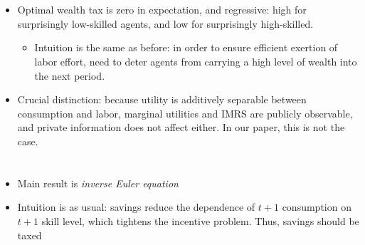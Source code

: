 \documentclass[11pt]{article}
\begin{document}
\section{\cite{kocherlakota2005zero}}
\begin{itemize}
    \item Optimal wealth tax is zero in expectation, and regressive: high for surprisingly low-skilled agents, and low for surprisingly high-skilled. 
    \begin{itemize}
        \item Intuition is the same as before: in order to ensure efficient exertion of labor effort, need to deter agents from carrying a high level of wealth into the next period. 
    \end{itemize}
    \item Crucial distinction: because utility is additively separable between consumption and labor, marginal utilities and IMRS are publicly observable, and private information does not affect either. In our paper, this is not the case. 
\end{itemize}

\section{\cite{golosov2003optimal}} \label{sec:golosov03}
\begin{itemize}
    \item Main result is \textit{inverse Euler equation}
    \item Intuition is as usual: savings reduce the dependence of \( t+1 \) consumption on \( t+1 \) skill level, which tightens the incentive problem. Thus, savings should be taxed
\end{itemize}
\end{document}
